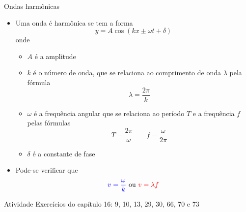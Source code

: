 \begin{frame}{Ondas harmônicas}
    \begin{itemize}
        \item Uma onda é harmônica se tem a forma
            \[
                y=A \cos{(kx \pm \omega t+ \delta)}
            \]
            onde
            \begin{itemize}
                \item \(A\) é a amplitude
                \item \(k\) é o número de onda, que se relaciona ao comprimento de onda 
                    \(\lambda\) pela fórmula
                    \[
                        \lambda = \frac{2\pi}{k}
                    \]
                \item \(\omega\) é a frequência angular que se relaciona ao período \(T\)
                    e a frequência \(f\) pelas fórmulas
                    \[
                        T=\frac{2\pi}{\omega} \qquad f=\frac{\omega}{2\pi}
                    \]
                \item \(\delta\) é a constante de fase
            \end{itemize}
        \item Pode-se verificar que
            \[
                {\color{blue} v=\frac{\omega}{k}} \text{ ou } {\color{red} v=\lambda f}
            \]
    \end{itemize}

\end{frame}

\begin{frame}{Atividade}
    Exercícios do capítulo 16: 9, 10, 13, 29, 30, 66, 70 e 73
\end{frame}
